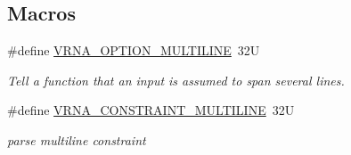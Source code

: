 \subsection*{Macros}
\begin{DoxyCompactItemize}
\item 
\#define \hyperlink{group__file__formats_gabec89c09874528c6cb73140a4c3d86d7}{V\+R\+N\+A\+\_\+\+O\+P\+T\+I\+O\+N\+\_\+\+M\+U\+L\+T\+I\+L\+I\+NE}~32U
\begin{DoxyCompactList}\small\item\em Tell a function that an input is assumed to span several lines. \end{DoxyCompactList}\item 
\#define \hyperlink{group__file__formats_ga7d725ef525b29891abef3f1ed42599a4}{V\+R\+N\+A\+\_\+\+C\+O\+N\+S\+T\+R\+A\+I\+N\+T\+\_\+\+M\+U\+L\+T\+I\+L\+I\+NE}~32U
\begin{DoxyCompactList}\small\item\em parse multiline constraint \end{DoxyCompactList}\end{DoxyCompactItemize}
